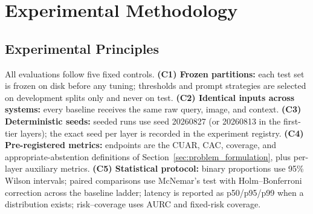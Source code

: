 
\section{Experimental Methodology}
\label{sec:experimental_methodology}

\subsection{Experimental Principles}
All evaluations follow five fixed controls.
\textbf{(C1) Frozen partitions:} each test set is frozen on disk before any tuning; thresholds and prompt strategies are selected on development splits only and never on test.
\textbf{(C2) Identical inputs across systems:} every baseline receives the same raw query, image, and context.
\textbf{(C3) Deterministic seeds:} seeded runs use seed 20260827 (or 20260813 in the first-tier layers); the exact seed per layer is recorded in the experiment registry.
\textbf{(C4) Pre-registered metrics:} endpoints are the CUAR, CAC, coverage, and appropriate-abstention definitions of Section~\ref{sec:problem_formulation}, plus per-layer auxiliary metrics.
\textbf{(C5) Statistical protocol:} binary proportions use 95\% Wilson intervals; paired comparisons use McNemar's test with Holm--Bonferroni correction across the baseline ladder; latency is reported as p50/p95/p99 when a distribution exists; risk--coverage uses AURC and fixed-risk coverage.


